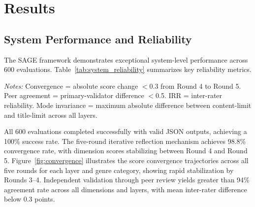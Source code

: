 \section{Results}
\label{sec:results}

\subsection{System Performance and Reliability}

The SAGE framework demonstrates exceptional system-level performance across 600 evaluations. Table~\ref{tab:system_reliability} summarizes key reliability metrics.

\begin{table}[t]
\centering
\caption{System reliability and quality assurance metrics}
\label{tab:system_reliability}
\small
{}
\vspace{0.1cm}

\small
\textit{Notes:} Convergence = absolute score change $<$0.3 from Round 4 to Round 5. Peer agreement = primary-validator difference $<$0.5. IRR = inter-rater reliability. Mode invariance = maximum absolute difference between content-limit and title-limit across all layers.
\end{table}

All 600 evaluations completed successfully with valid JSON outputs, achieving a 100\% success rate. The five-round iterative reflection mechanism achieves 98.8\% convergence rate, with dimension scores stabilizing between Round 4 and Round 5. Figure~\ref{fig:convergence} illustrates the score convergence trajectories across all five rounds for each layer and genre category, showing rapid stabilization by Rounds 3--4. Independent validation through peer review yields greater than 94\% agreement rate across all dimensions and layers, with mean inter-rater difference below 0.3 points.

